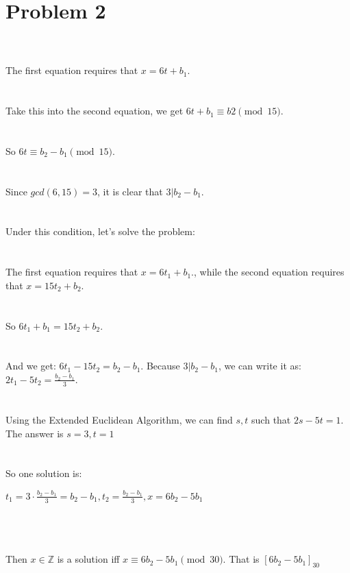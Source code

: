 \documentclass{article}
\begin{document}
\section{Problem 2}
\\ \hspace*{\fill} \\
The first equation requires that $x = 6t + b_1.$\\
\\ \hspace*{\fill} \\
Take this into the second equation, we get $6t + b_1 \equiv b2 \pmod {15}$.\\
\\ \hspace*{\fill} \\
So $6t \equiv b_2 - b_1 \pmod {15}$.\\
\\ \hspace*{\fill} \\
Since $gcd(6, 15) = 3$, it is clear that $3|b_2 - b_1$.\\
\\ \hspace*{\fill} \\
Under this condition, let's solve the problem:\\
\\ \hspace*{\fill} \\
The first equation requires that $x = 6t_1 + b_1.$, while the second equation requires that $x = 15t_2 + b_2.$\\
\\ \hspace*{\fill} \\
So $6t_1 + b_1 = 15t_2 + b_2$.\\
\\ \hspace*{\fill} \\
And we get: $6t_1 - 15t_2 = b_2 - b_1$. Because $3|b_2 - b_1$, we can write it as: $2t_1 - 5t_2 = \frac{b_2 - b_1}{3}$.\\
\\ \hspace*{\fill} \\
Using the Extended Euclidean Algorithm, we can find $s, t$ such that $2s - 5t = 1$. The answer is $s = 3, t = 1$\\
\\ \hspace*{\fill} \\
So one solution is: \\
\centerline{$t_1 = 3\cdot\frac{b_2 - b_1}{3} = b_2 - b_1 , t_2 = \frac{b_2 - b_1}{3}, x = 6b_2 - 5b_1$}\\
\\ \hspace*{\fill} \\
Then $ x \in \mathbb{Z}$ is a solution iff $x \equiv 6b_2 - 5b_1 \pmod {30}$. That is $[6b_2 - 5b_1]_{30}$\\
\\ \hspace*{\fill} \\
\newpage
\end{document}
